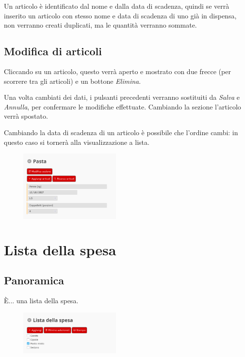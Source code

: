 \documentclass[12pt, a4paper]{article}
\begin{document}
    Un articolo è identificato dal nome e dalla data di scadenza, quindi se
    verrà inserito un articolo con stesso nome e data di scadenza di uno già in
    dispensa, non verranno creati duplicati, ma le quantità verranno sommate.

    \subsection{Modifica di articoli}

    Cliccando su un articolo, questo verrà aperto e mostrato con due frecce
    (per scorrere tra gli articoli) e un bottone \emph{Elimina}.

    Una volta cambiati dei dati, i pulsanti precedenti verranno sostituiti da
    \emph{Salva} e \emph{Annulla}, per confermare le modifiche effettuate.
    Cambiando la sezione l'articolo verrà spostato.
    
    Cambiando la data di scadenza di un articolo è possibile che l'ordine
    cambi: in questo caso si tornerà alla visualizzazione a lista.

    \begin{figure}[H]
        \centering
        \includegraphics[width=0.45\textwidth]{assets/it/article.png}
    \end{figure}



    \section{Lista della spesa}

    \subsection{Panoramica}

    È... una lista della spesa.

    \begin{figure}[H]
        \centering
        \includegraphics[width=0.45\textwidth]{assets/it/shopping_list.png}
    \end{figure}
\end{document}

